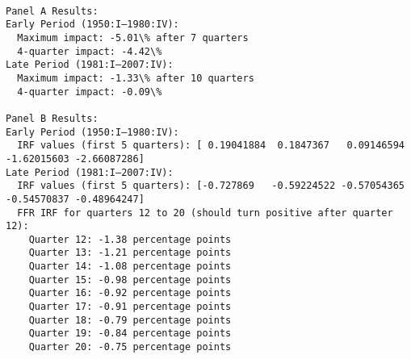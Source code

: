 \documentclass[11pt]{article}
\begin{document}
    \begin{Verbatim}[commandchars=\\\{\}]

Panel A Results:
Early Period (1950:I–1980:IV):
  Maximum impact: -5.01\% after 7 quarters
  4-quarter impact: -4.42\%
Late Period (1981:I–2007:IV):
  Maximum impact: -1.33\% after 10 quarters
  4-quarter impact: -0.09\%

Panel B Results:
Early Period (1950:I–1980:IV):
  IRF values (first 5 quarters): [ 0.19041884  0.1847367   0.09146594
-1.62015603 -2.66087286]
Late Period (1981:I–2007:IV):
  IRF values (first 5 quarters): [-0.727869   -0.59224522 -0.57054365
-0.54570837 -0.48964247]
  FFR IRF for quarters 12 to 20 (should turn positive after quarter 12):
    Quarter 12: -1.38 percentage points
    Quarter 13: -1.21 percentage points
    Quarter 14: -1.08 percentage points
    Quarter 15: -0.98 percentage points
    Quarter 16: -0.92 percentage points
    Quarter 17: -0.91 percentage points
    Quarter 18: -0.79 percentage points
    Quarter 19: -0.84 percentage points
    Quarter 20: -0.75 percentage points
    \end{Verbatim}
\end{document}
